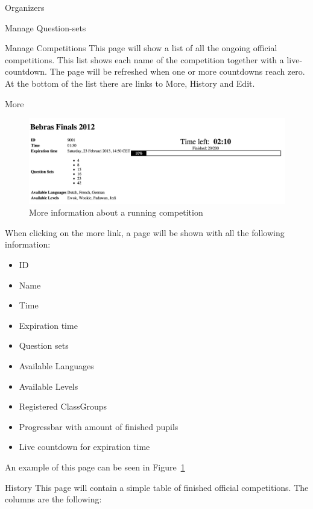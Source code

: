 \begin{section}{Organizers}
\begin{subsection}{Manage Question-sets}
	\end{subsection}
	
	\begin{subsection}{Manage Competitions}
		This page will show a list of all the ongoing official competitions.
		This list shows each name of the competition together with a live-countdown.
		The page will be refreshed when one or more countdowns reach zero.
		At the bottom of the list there are links to More, History and Edit.
		\begin{subsubsection}{More}
			\begin{figure}[!h]
			  \centering
				\includegraphics[width=1\textwidth]{img/manage_competitions_more.png}
			  \caption{More information about a running competition}
			  \label{manage_competitions_more}
			\end{figure}
			\label{sec:manage_comp_more}
			When clicking on the more link, a page will be shown with all the following
			information:
			\begin{itemize}
				\item ID
				\item Name
				\item Time
				\item Expiration time
				\item Question sets
				\item Available Languages
				\item Available Levels
				\item Registered ClassGroups
				\item Progressbar with amount of finished pupils
				\item Live countdown for expiration time
			\end{itemize}
			An example of this page can be seen in Figure~\ref{manage_competitions_more}
		\end{subsubsection}
		\begin{subsubsection}{History}
			This page will contain a simple table of finished official competitions.
			The columns are the following:
			\begin{itemize}

\end{itemize}
\end{subsubsection}
\end{subsection}
\end{section}
